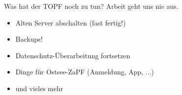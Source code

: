 \documentclass[compress, aspectratio=169]{beamer}
\begin{document}
\pagestyle{empty}
\begin{frame}{Was hat der TOPF noch zu tun?}
  Arbeit geht uns nie aus.
  \begin{itemize}
    \item Alten Server abschalten (fast fertig!)
    \item Backups!
    \item Datenschutz-Überarbeitung fortsetzen
    \item Dinge für Ostsee-ZaPF (Anmeldung, App, ...)
    \item und vieles mehr
  \end{itemize}
\end{frame}
\end{document}
